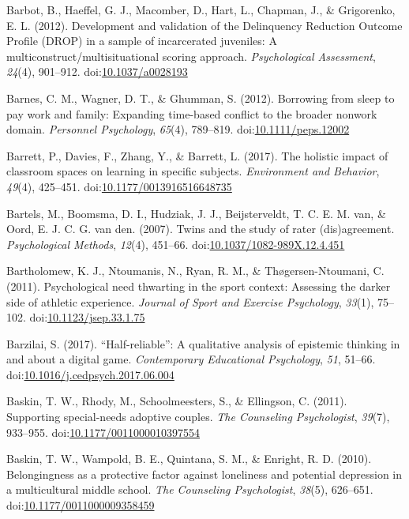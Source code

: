 \documentclass[english,man]{apa6}
\begin{document}
\hypertarget{ref-Barbot2012}{}
Barbot, B., Haeffel, G. J., Macomber, D., Hart, L., Chapman, J., \&
Grigorenko, E. L. (2012). Development and validation of the Delinquency
Reduction Outcome Profile (DROP) in a sample of incarcerated juveniles:
A multiconstruct/multisituational scoring approach. \emph{Psychological
Assessment}, \emph{24}(4), 901--912.
doi:\href{https://doi.org/10.1037/a0028193}{10.1037/a0028193}

\hypertarget{ref-Barnes2012}{}
Barnes, C. M., Wagner, D. T., \& Ghumman, S. (2012). Borrowing from
sleep to pay work and family: Expanding time-based conflict to the
broader nonwork domain. \emph{Personnel Psychology}, \emph{65}(4),
789--819.
doi:\href{https://doi.org/10.1111/peps.12002}{10.1111/peps.12002}

\hypertarget{ref-Barrett2017}{}
Barrett, P., Davies, F., Zhang, Y., \& Barrett, L. (2017). The holistic
impact of classroom spaces on learning in specific subjects.
\emph{Environment and Behavior}, \emph{49}(4), 425--451.
doi:\href{https://doi.org/10.1177/0013916516648735}{10.1177/0013916516648735}

\hypertarget{ref-Bartels2007}{}
Bartels, M., Boomsma, D. I., Hudziak, J. J., Beijsterveldt, T. C. E. M.
van, \& Oord, E. J. C. G. van den. (2007). Twins and the study of rater
(dis)agreement. \emph{Psychological Methods}, \emph{12}(4), 451--66.
doi:\href{https://doi.org/10.1037/1082-989X.12.4.451}{10.1037/1082-989X.12.4.451}

\hypertarget{ref-Bartholomew2011}{}
Bartholomew, K. J., Ntoumanis, N., Ryan, R. M., \& Thøgersen-Ntoumani,
C. (2011). Psychological need thwarting in the sport context: Assessing
the darker side of athletic experience. \emph{Journal of Sport and
Exercise Psychology}, \emph{33}(1), 75--102.
doi:\href{https://doi.org/10.1123/jsep.33.1.75}{10.1123/jsep.33.1.75}

\hypertarget{ref-Barzilai2017}{}
Barzilai, S. (2017). ``Half-reliable'': A qualitative analysis of
epistemic thinking in and about a digital game. \emph{Contemporary
Educational Psychology}, \emph{51}, 51--66.
doi:\href{https://doi.org/10.1016/j.cedpsych.2017.06.004}{10.1016/j.cedpsych.2017.06.004}

\hypertarget{ref-Baskin2011}{}
Baskin, T. W., Rhody, M., Schoolmeesters, S., \& Ellingson, C. (2011).
Supporting special-needs adoptive couples. \emph{The Counseling
Psychologist}, \emph{39}(7), 933--955.
doi:\href{https://doi.org/10.1177/0011000010397554}{10.1177/0011000010397554}

\hypertarget{ref-Baskin2010}{}
Baskin, T. W., Wampold, B. E., Quintana, S. M., \& Enright, R. D.
(2010). Belongingness as a protective factor against loneliness and
potential depression in a multicultural middle school. \emph{The
Counseling Psychologist}, \emph{38}(5), 626--651.
doi:\href{https://doi.org/10.1177/0011000009358459}{10.1177/0011000009358459}
\end{document}
